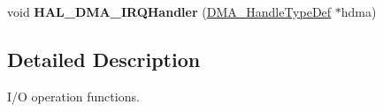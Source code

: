 \begin{DoxyCompactItemize}
\item 
void {\bfseries H\+A\+L\+\_\+\+D\+M\+A\+\_\+\+I\+R\+Q\+Handler} (\hyperlink{group___d_m_a___exported___types_ga41b754a906b86bce54dc79938970138b}{D\+M\+A\+\_\+\+Handle\+Type\+Def} $\ast$hdma)\hypertarget{group___d_m_a___exported___functions___group2_ga8c8564d06f6d39b702af1c5cbb7dd54a}{}\label{group___d_m_a___exported___functions___group2_ga8c8564d06f6d39b702af1c5cbb7dd54a}

\end{DoxyCompactItemize}


\subsection{Detailed Description}
I/O operation functions. 

